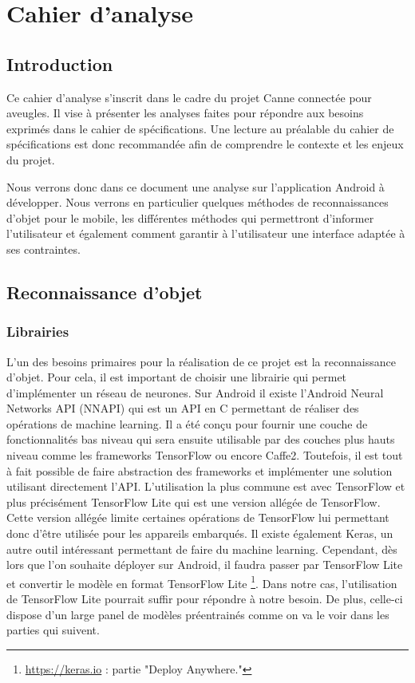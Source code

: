 \documentclass[UTF8]{EPURapport}
\begin{document}
\chapter{Cahier d'analyse}

\section{Introduction}
Ce cahier d'analyse s'inscrit dans le cadre du projet Canne connectée pour aveugles. Il vise à présenter les analyses faites pour répondre aux besoins exprimés dans le cahier de spécifications. Une lecture au préalable du cahier de spécifications est donc recommandée afin de comprendre le contexte et les enjeux du projet.

Nous verrons donc dans ce document une analyse sur l'application Android à développer. Nous verrons en particulier quelques méthodes de reconnaissances d'objet pour le mobile, les différentes méthodes qui permettront d'informer l'utilisateur et également comment garantir à l'utilisateur une interface adaptée à ses contraintes.

\section{Reconnaissance d'objet}
\subsection{Librairies}
L'un des besoins primaires pour la réalisation de ce projet est la reconnaissance d'objet. Pour cela, il est important de choisir une librairie qui permet d'implémenter un réseau de neurones. Sur Android il existe l'Android Neural Networks API (NNAPI) qui est un API en C permettant de réaliser des opérations de machine learning. Il a été conçu pour fournir une couche de fonctionnalités bas niveau qui sera ensuite utilisable par des couches plus hauts niveau comme les frameworks TensorFlow ou encore Caffe2. Toutefois, il est tout à fait possible de faire abstraction des frameworks et implémenter une solution utilisant directement l'API. L'utilisation la plus commune est avec TensorFlow et plus précisément TensorFlow Lite qui est une version allégée de TensorFlow. Cette version allégée limite certaines opérations de TensorFlow lui permettant donc d'être utilisée pour les appareils embarqués. Il existe également Keras, un autre outil intéressant permettant de faire du machine learning. Cependant, dès lors que l'on souhaite déployer sur Android, il faudra passer par TensorFlow Lite et convertir le modèle en format TensorFlow Lite \footnote{\url{https://keras.io} : partie "Deploy Anywhere."}. Dans notre cas, l'utilisation de TensorFlow Lite pourrait suffir pour répondre à notre besoin. De plus, celle-ci dispose d'un large panel de modèles préentrainés comme on va le voir dans les parties qui suivent.  
\end{document}
